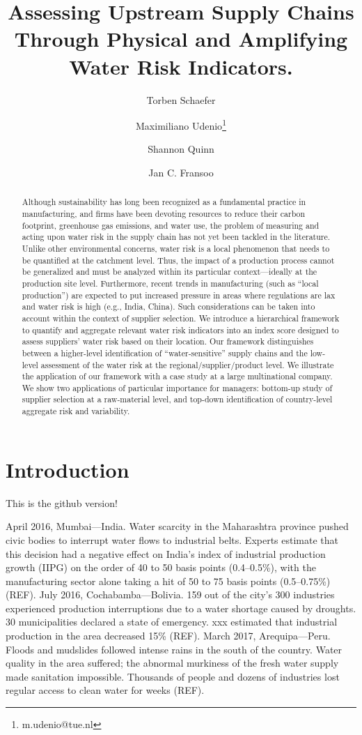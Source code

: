 \documentclass[a4paper]{article}
\title{Assessing Upstream Supply Chains Through Physical and Amplifying Water Risk Indicators.}
\author{Torben Schaefer}
\author{Maximiliano Udenio\thanks{m.udenio@tue.nl} }
\author{Shannon Quinn}
\author{Jan C. Fransoo}
\affil{Department of Industrial Engineering, Eindhoven University of Technology, 5600 MB Eindhoven, The Netherlands}
\date{}
\begin{document}
\sloppy %

\maketitle

\begin{abstract}
Although sustainability has long been recognized as a fundamental practice in manufacturing, and firms have been devoting resources to reduce their carbon footprint, greenhouse gas emissions, and water use, the problem of measuring and acting upon water risk in the supply chain has not yet been tackled in the literature. 
Unlike other environmental concerns, water risk is a local phenomenon that needs to be quantified at the catchment level.  
Thus, the impact of a production process cannot be generalized and must be analyzed within its particular context---ideally at the production site level.
Furthermore, recent trends in manufacturing (such as ``local production'') are expected to put increased pressure in areas where regulations are lax and water risk is high (e.g., India, China).
Such considerations can be taken into account within the context of supplier selection.
We introduce a hierarchical framework to quantify and aggregate relevant water risk indicators into an index score designed to assess suppliers' water risk based on their location. 
Our framework distinguishes between a higher-level identification of ``water-sensitive'' supply chains and the low-level assessment of the water risk at the regional/supplier/product level. 
We illustrate the application of our framework with a case study at a large multinational company. 
We show two applications of particular importance for managers: bottom-up study of supplier selection at a raw-material level, and top-down identification of country-level aggregate risk and variability.
\end{abstract}

\section{Introduction}

This is the github version!

April 2016, Mumbai---India. 
Water scarcity in the Maharashtra province pushed civic bodies to interrupt water flows to industrial belts. 
Experts estimate that this decision had a negative effect on India's index of industrial production growth (IIPG) on the order of 40 to 50 basis points (0.4--0.5\%), with the manufacturing sector alone taking a hit of 50 to 75 basis points (0.5--0.75\%) (REF).
July 2016, Cochabamba---Bolivia. 
159 out of the city's 300 industries experienced production interruptions due to a water shortage caused by droughts. 
30 municipalities declared a state of emergency. 
xxx estimated that industrial production in the area decreased 15\% (REF). 
March 2017, Arequipa---Peru. 
Floods and mudslides followed intense rains in the south of the country. 
Water quality in the area suffered; the abnormal murkiness of the fresh water supply made sanitation impossible. 
Thousands of people and dozens of industries lost regular access to clean water for weeks (REF).
\end{document}
